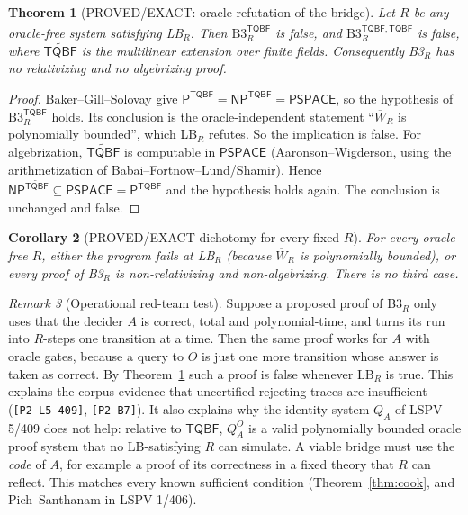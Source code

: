 \documentclass[11pt]{article}
\newtheorem{theorem}{Theorem}
\newtheorem{corollary}[theorem]{Corollary}
\theoremstyle{definition}
\theoremstyle{remark}
\newtheorem{remark}[theorem]{Remark}
\newcommand{\Wbar}{\overline W}
\newcommand{\NP}{\mathsf{NP}}
\newcommand{\Pc}{\mathsf{P}}
\newcommand{\PSPACE}{\mathsf{PSPACE}}
\newcommand{\TQBF}{\mathsf{TQBF}}
\begin{document}
\begin{theorem}[PROVED/EXACT: oracle refutation of the bridge]\label{thm:rel}
Let $R$ be any oracle-free system satisfying LB$_R$. Then $\mathrm{B3}_R^{\TQBF}$ is false,
and $\mathrm{B3}_R^{\TQBF,\widetilde{\TQBF}}$ is false, where $\widetilde{\TQBF}$ is the
multilinear extension over finite fields. Consequently B3$_R$ has no relativizing and no
algebrizing proof.
\end{theorem}
\begin{proof}
Baker--Gill--Solovay give $\Pc^{\TQBF}=\NP^{\TQBF}=\PSPACE$, so the hypothesis of
$\mathrm{B3}_R^{\TQBF}$ holds. Its conclusion is the oracle-independent statement
``$\Wbar_R$ is polynomially bounded'', which LB$_R$ refutes. So the implication is false.
For algebrization, $\widetilde{\TQBF}$ is computable in $\PSPACE$ (Aaronson--Wigderson,
using the arithmetization of Babai--Fortnow--Lund/Shamir). Hence
$\NP^{\widetilde{\TQBF}}\subseteq\PSPACE=\Pc^{\TQBF}$ and the hypothesis holds again.
The conclusion is unchanged and false.
\end{proof}

\begin{corollary}[PROVED/EXACT dichotomy for every fixed $R$]
For every oracle-free $R$, either the program fails at LB$_R$ (because $\Wbar_R$ is
polynomially bounded), or every proof of B3$_R$ is non-relativizing and
non-algebrizing. There is no third case.
\end{corollary}

\begin{remark}[Operational red-team test]
Suppose a proposed proof of B3$_R$ only uses that the decider $A$ is correct, total and
polynomial-time, and turns its run into $R$-steps one transition at a time. Then the same
proof works for $A$ with oracle gates, because a query to $O$ is just one more transition
whose answer is taken as correct. By Theorem~\ref{thm:rel} such a proof is false whenever
LB$_R$ is true. This explains the corpus evidence that uncertified rejecting traces are
insufficient (\texttt{[P2-L5-409]}, \texttt{[P2-B7]}). It also explains why the identity system
$Q_A$ of LSPV-5/409 does not help: relative to $\TQBF$, $Q_A^{O}$ is a valid
polynomially bounded oracle proof system that no LB-satisfying $R$ can simulate.
A viable bridge must use the \emph{code} of $A$, for example a proof of its correctness in
a fixed theory that $R$ can reflect. This matches every known sufficient condition
(Theorem~\ref{thm:cook}, and Pich--Santhanam in LSPV-1/406).
\end{remark}
\end{document}

